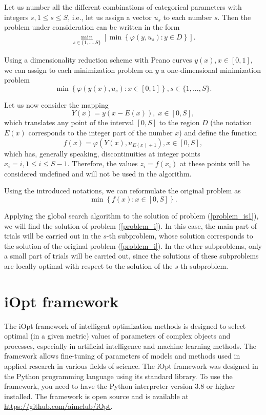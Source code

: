 \documentclass[preprint,12pt]{elsarticle}
\begin{document}
Let us number all the different combinations of categorical parameters with integers $s, 1\leq s \leq S$, i.e., let us assign a vector $u_s$ to each number $s$. Then the problem under consideration can be written in the form
\begin{gather}\label{problem_is}
 \min_{s\in\{1,...,S\}}\left[\min{\left\{ \varphi(y,u_s) : y\in D \right\}}\right].
\end{gather}

Using a dimensionality reduction scheme with Peano curves $y(x), x\in [0,1]$,  we can assign to each minimization problem on $y$ a one-dimensional minimization problem
\[
 \min{\left\{ \varphi(y(x),u_s): x \in [0,1] \right\}}, s \in \{1,...,S\}.
\]

Let us now consider the mapping
\[
Y(x)=y(x-E(x)), \; x\in[0,S],
\]
which translates any point of the interval $[0,S]$ to the region $D$ (the notation $E(x)$ corresponds to the integer part of the number $x$) and define the function
\[
f(x) = \varphi(Y(x),u_{E(x)+1}), x\in[0,S],
\]
which has, generally speaking, discontinuities at integer points $x_i = i, 1 \leq i \leq S-1$.
Therefore, the values $z_i = f(x_i)$ at these points will be considered undefined and will not be used in the algorithm.

Using the introduced notations, we can reformulate the original problem as
\begin{equation}\label{problem_is1}
\min \left\{f(x): x \in [0,S] \right\}.
\end{equation}

Applying the global search algorithm to the solution of problem (\ref{problem_is1}), we will find the solution of problem (\ref{problem_i}). In this case, the main part of trials will be carried out in the $s$-th subproblem, whose solution corresponds to the solution of the original problem (\ref{problem_i}). In the other subproblems, only a small part of trials will be carried out, since the solutions of these subproblems are locally optimal with respect to the solution of the $s$-th subproblem.

\section{iOpt framework} 
\label{sec_iOpt}

The iOpt framework of intelligent optimization methods is designed to select optimal (in a given metric) values of parameters of complex objects and processes, especially in artificial intelligence and machine learning methods. The framework allows fine-tuning of parameters of models and methods used in applied research in various fields of science.  The iOpt framework was designed in the Python programming language using its standard library. To use the framework, you need to have the Python interpreter version 3.8 or higher installed. The framework is open source and is available at \url{https://github.com/aimclub/iOpt}.
\end{document}
